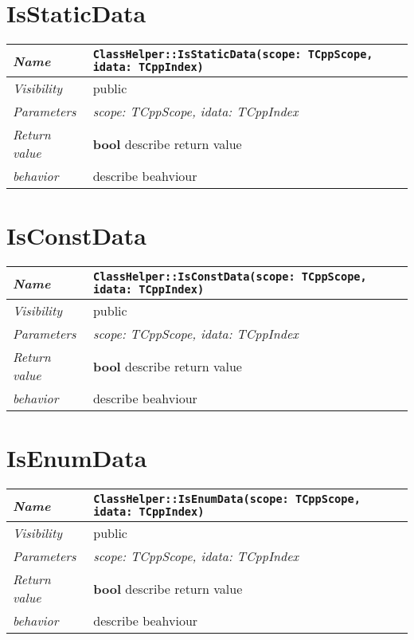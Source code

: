  \section{IsStaticData}
\begin{longtable}{p{3cm} @{\hskip 1cm} p{12cm}}
 \hline
\textit{Name} & \texttt{ClassHelper::IsStaticData(scope: TCppScope, idata: TCppIndex)}\\
\hline
 \textit{Visibility} & public\\
\hline
\textit{Parameters} & \textit{scope: TCppScope, idata: TCppIndex}\\
\hline
\textit{Return value} & \textbf{ bool} describe return value\\
  \hline
 \textit{behavior} & describe beahviour \\
\hline
\end{longtable} \pagebreak
 \section{IsConstData}
\begin{longtable}{p{3cm} @{\hskip 1cm} p{12cm}}
 \hline
\textit{Name} & \texttt{ClassHelper::IsConstData(scope: TCppScope, idata: TCppIndex)}\\
\hline
 \textit{Visibility} & public\\
\hline
\textit{Parameters} & \textit{scope: TCppScope, idata: TCppIndex}\\
\hline
\textit{Return value} & \textbf{ bool} describe return value\\
  \hline
 \textit{behavior} & describe beahviour \\
\hline
\end{longtable} \pagebreak
 \section{IsEnumData}
\begin{longtable}{p{3cm} @{\hskip 1cm} p{12cm}}
 \hline
\textit{Name} & \texttt{ClassHelper::IsEnumData(scope: TCppScope, idata: TCppIndex)}\\
\hline
 \textit{Visibility} & public\\
\hline
\textit{Parameters} & \textit{scope: TCppScope, idata: TCppIndex}\\
\hline
\textit{Return value} & \textbf{ bool} describe return value\\
  \hline
 \textit{behavior} & describe beahviour \\
\hline
\end{longtable} \pagebreak
